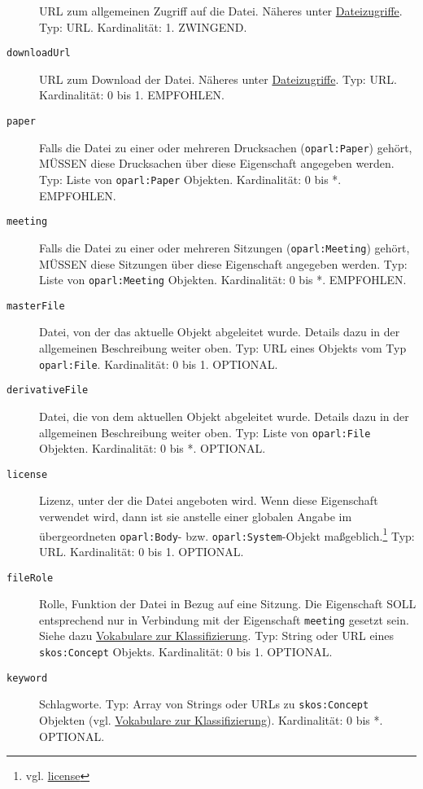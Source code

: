 \documentclass[,a4paper]{article}
\begin{document}
\begin{description}
URL zum allgemeinen Zugriff auf die Datei. Näheres unter
\hyperref[dateizugriff]{Dateizugriffe}. Typ: URL. Kardinalität: 1.
ZWINGEND.
\item[\texttt{downloadUrl}]
URL zum Download der Datei. Näheres unter
\hyperref[dateizugriff]{Dateizugriffe}. Typ: URL. Kardinalität: 0 bis 1.
EMPFOHLEN.
\item[\texttt{paper}]
Falls die Datei zu einer oder mehreren Drucksachen
(\texttt{oparl:Paper}) gehört, MÜSSEN diese Drucksachen über diese
Eigenschaft angegeben werden. Typ: Liste von \texttt{oparl:Paper}
Objekten. Kardinalität: 0 bis *. EMPFOHLEN.
\item[\texttt{meeting}]
Falls die Datei zu einer oder mehreren Sitzungen
(\texttt{oparl:Meeting}) gehört, MÜSSEN diese Sitzungen über diese
Eigenschaft angegeben werden. Typ: Liste von \texttt{oparl:Meeting}
Objekten. Kardinalität: 0 bis *. EMPFOHLEN.
\item[\texttt{masterFile}]
Datei, von der das aktuelle Objekt abgeleitet wurde. Details dazu in der
allgemeinen Beschreibung weiter oben. Typ: URL eines Objekts vom Typ
\texttt{oparl:File}. Kardinalität: 0 bis 1. OPTIONAL.
\item[\texttt{derivativeFile}]
Datei, die von dem aktuellen Objekt abgeleitet wurde. Details dazu in
der allgemeinen Beschreibung weiter oben. Typ: Liste von
\texttt{oparl:File} Objekten. Kardinalität: 0 bis *. OPTIONAL.
\item[\texttt{license}]
Lizenz, unter der die Datei angeboten wird. Wenn diese Eigenschaft
verwendet wird, dann ist sie anstelle einer globalen Angabe im
übergeordneten \texttt{oparl:Body}- bzw. \texttt{oparl:System}-Objekt
maßgeblich.\footnote{vgl. \hyperref[eigenschaftux5flicense]{license}}
Typ: URL. Kardinalität: 0 bis 1. OPTIONAL.
\item[\texttt{fileRole}]
Rolle, Funktion der Datei in Bezug auf eine Sitzung. Die Eigenschaft
SOLL entsprechend nur in Verbindung mit der Eigenschaft \texttt{meeting}
gesetzt sein. Siehe dazu
\hyperref[vokabulareux5fklassifizierung]{Vokabulare zur
Klassifizierung}. Typ: String oder URL eines \texttt{skos:Concept}
Objekts. Kardinalität: 0 bis 1. OPTIONAL.
\item[\texttt{keyword}]
Schlagworte. Typ: Array von Strings oder URLs zu \texttt{skos:Concept}
Objekten (vgl. \hyperref[vokabulareux5fklassifizierung]{Vokabulare zur
Klassifizierung}). Kardinalität: 0 bis *. OPTIONAL.
\end{description}

\end{document}
